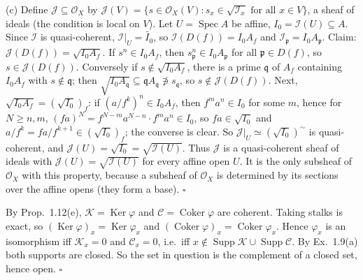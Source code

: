 \documentclass[11pt]{article}
\begin{document}
(c) Define $\mathcal{J}\subseteq\mathcal{O}_X$ by $\mathcal{J}(V)=\{s\in\mathcal{O}_X(V): s_x\in\sqrt{\mathcal{I}_x}\text{ for all }x\in V\}$, a sheaf of ideals (the condition is local on $V$). Let $U=\operatorname{Spec}A$ be affine, $I_0=\mathcal{I}(U)\subseteq A$. Since $\mathcal{I}$ is quasi-coherent, $\mathcal{I}|_U=\widetilde{I_0}$, so $\mathcal{I}(D(f))=I_0A_f$ and $\mathcal{I}_\mathfrak{p}=I_0A_\mathfrak{p}$. Claim: $\mathcal{J}(D(f))=\sqrt{I_0A_f}$. If $s^n\in I_0A_f$, then $s_\mathfrak{p}^n\in I_0A_\mathfrak{p}$ for all $\mathfrak{p}\in D(f)$, so $s\in\mathcal{J}(D(f))$. Conversely if $s\notin\sqrt{I_0A_f}$, there is a prime $\mathfrak{q}$ of $A_f$ containing $I_0A_f$ with $s\notin\mathfrak{q}$; then $\sqrt{I_0A_\mathfrak{q}}\subseteq\mathfrak{q}A_\mathfrak{q}\not\ni s_\mathfrak{q}$, so $s\notin\mathcal{J}(D(f))$. Next, $\sqrt{I_0A_f}=(\sqrt{I_0})_f$: if $(a/f^k)^n\in I_0A_f$, then $f^ma^n\in I_0$ for some $m$, hence for $N\ge n,m$, $(fa)^N=f^{N-m}a^{N-n}\cdot f^ma^n\in I_0$, so $fa\in\sqrt{I_0}$ and $a/f^k=fa/f^{k+1}\in(\sqrt{I_0})_f$; the converse is clear. So $\mathcal{J}|_U\simeq(\sqrt{I_0})^\sim$ is quasi-coherent, and $\mathcal{J}(U)=\sqrt{I_0}=\sqrt{\mathcal{I}(U)}$. Thus $\mathcal{J}$ is a quasi-coherent sheaf of ideals with $\mathcal{J}(U)=\sqrt{\mathcal{I}(U)}$ for every affine open $U$. It is the only subsheaf of $\mathcal{O}_X$ with this property, because a subsheaf of $\mathcal{O}_X$ is determined by its sections over the affine opens (they form a base). \hfill$\square$

\pf
By Prop.~1.12(e), $\mathcal{K}=\operatorname{Ker}\varphi$ and $\mathcal{C}=\operatorname{Coker}\varphi$ are coherent. Taking stalks is exact, so $(\operatorname{Ker}\varphi)_x=\operatorname{Ker}\varphi_x$ and $(\operatorname{Coker}\varphi)_x=\operatorname{Coker}\varphi_x$. Hence $\varphi_x$ is an isomorphism iff $\mathcal{K}_x=0$ and $\mathcal{C}_x=0$, i.e.\ iff $x\notin\operatorname{Supp}\mathcal{K}\cup\operatorname{Supp}\mathcal{C}$. By Ex.~1.9(a) both supports are closed. So the set in question is the complement of a closed set, hence open. \hfill$\square$
\end{document}
